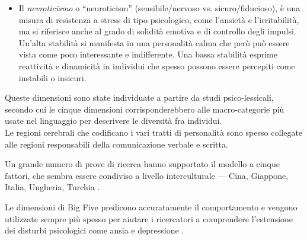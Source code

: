 \begin{itemize}
	\item Il \emph{nevroticismo} o ``neuroticism'' (sensibile/nervoso vs. sicuro/fiducioso), è una misura di resistenza a stress di tipo psicologico, come l'ansietà e l'irritabilità, ma si riferisce anche al grado di solidità emotiva e di controllo degli impulsi.\\
	Un'alta stabilità si manifesta in una personalità calma che però può essere vista come poco interessante e indifferente. Una bassa stabilità esprime reattività e dinamicità in individui che spesso possono essere percepiti come instabili o insicuri. 
\end{itemize}
Queste dimensioni sono state individuate a partire da studi psico-lessicali, secondo cui le cinque dimensioni corrisponderebbero alle macro-categorie più usate nel linguaggio per descrivere le diversità fra individui.\\
Le regioni cerebrali che codificano i vari tratti di personalità sono spesso collegate alle regioni responsabili della comunicazione verbale e scritta. 

Un grande numero di prove di ricerca hanno supportato il modello a cinque fattori, che sembra essere condiviso a livello interculturale --- Cina, Giappone, Italia, Ungheria, Turchia \cite{triandis2002cultural}.

Le dimensioni di Big Five predicono accuratamente il comportamento e vengono utilizzate sempre più spesso per aiutare i ricercatori a comprendere l'estensione dei disturbi psicologici come ansia e depressione \cite{saulsman2004five}.

